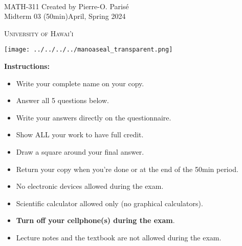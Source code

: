 \documentclass[addpoints, 12pt]{exam}%
\theoremstyle{definition}
\begin{document}
	\noindent \hrulefill \\
	\noindent MATH-311 \hfill Created by Pierre-O. Paris{\'e}\\
	Midterm 03 (50min)\hfill April, Spring 2024\\\vspace*{-0.7cm}

\noindent\hrulefill

\vspace*{0.5cm}

\begin{center}
\begin{minipage}{0.6\textwidth}
\begin{Huge}
\textsc{University of Hawai'i}
\end{Huge}
\end{minipage}
\begin{minipage}{0.12\textwidth}
\texttt{[image: ../../../../manoaseal\_transparent.png]}
\end{minipage}
\end{center}
	
\vspace*{0.5cm}

\noindent{}

\vspace*{0.5cm}

\noindent{}

\vspace*{1cm}

\begin{center}
\gradetable[h][questions]
\end{center}

\vspace*{1cm}

\noindent\textbf{Instructions:} 

\begin{itemize}
\item Write your complete name on your copy. 
\item Answer all 5 questions below.
\item Write your answers directly on the questionnaire.
\item Show ALL your work to have full credit.
\item Draw a square around your final answer.
\item Return your copy when you're done or at the end of the 50min period. 
\item No electronic devices allowed during the exam. 
\item Scientific calculator allowed only (no graphical calculators).
\item \textbf{Turn off your cellphone(s) during the exam}.
\item Lecture notes and the textbook are not allowed during the exam. 
\end{itemize}
\end{document}
